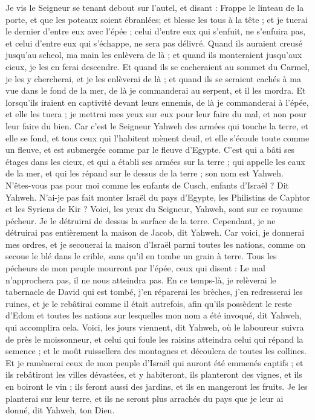 \begin{multicols}{2}
\VerseOne{}Je vis le Seigneur se tenant debout sur l’autel, et disant  : Frappe le linteau de la porte, et que les poteaux soient ébranlées; et blesse les tous à la tête ; et je tuerai le dernier d’entre eux avec l’épée ; celui d’entre eux qui s’enfuit, ne s’enfuira pas, et celui d’entre eux qui s’échappe, ne sera pas délivré.
Quand ils auraient creusé jusqu'au scheol, ma main les enlèvera de là ; et quand ils monteraient jusqu'aux cieux, je les en ferai descendre.
Et quand  ils se cacheraient au sommet du Carmel, je les y chercherai, et je les enlèverai de là ; et quand  ils se seraient cachés à ma vue dans le fond de la mer, de là je commanderai au serpent, et il les mordra.
Et lorsqu'ils iraient en captivité devant leurs ennemis, de là je commanderai à l’épée, et elle les tuera ;  je mettrai mes yeux sur eux pour leur faire du mal, et non pour leur faire du bien.
Car c'est le Seigneur Yahweh des armées qui touche la terre, et elle se fond, et tous ceux qui l'habitent mènent deuil, et elle s'écoule toute comme un fleuve, et est submergée comme par le fleuve d'Egypte. 
C'est qui a bâti ses étages dans les cieux, et qui a établi ses armées sur la terre ; qui appelle les eaux de la mer, et qui les répand sur le dessus de la terre ; son nom est Yahweh. 
N'êtes-vous pas pour moi comme les enfants de Cusch, enfants d'Israël ? Dit Yahweh. N'ai-je pas fait monter Israël du pays d'Egypte, les Philistins de Caphtor et les Syriens de Kir ?
Voici, les yeux du Seigneur, Yahweh, sont sur ce royaume pécheur. Je le détruirai de dessus la surface de la terre. Cependant, je ne détruirai pas entièrement la maison de Jacob, dit Yahweh.
Car voici, je donnerai mes ordres, et je secouerai la maison d'Israël parmi toutes les nations, comme on secoue le blé dans le crible, sans qu'il en tombe un grain à terre.
Tous les pécheurs de mon peuple mourront par l'épée, ceux qui disent : Le mal n'approchera pas, il ne nous atteindra pas.
En ce temps-là, je relèverai le tabernacle de David qui est tombé, j'en réparerai les brèches, j'en redresserai les ruines, et je le rebâtirai comme il était autrefois,
afin qu'ils possèdent le reste d'Edom et toutes les nations sur lesquelles mon nom a été invoqué, dit Yahweh, qui accomplira cela.
Voici, les jours viennent, dit Yahweh, où le laboureur suivra de près le moissonneur, et celui qui foule les raisins atteindra celui qui répand la semence ; et le moût ruissellera des montagnes et découlera de toutes les collines.
Et je ramènerai ceux de mon peuple d'Israël qui auront été emmenés captifs ; et ils rebâtiront les villes dévastées, et y habiteront, ils planteront des vignes, et ils en boiront le vin ; ils feront aussi des jardins, et ils en mangeront les fruits.
Je les planterai sur leur terre, et ils ne seront plus arrachés du pays que je leur ai donné, dit Yahweh, ton Dieu.
\PPE{}
\end{multicols}
